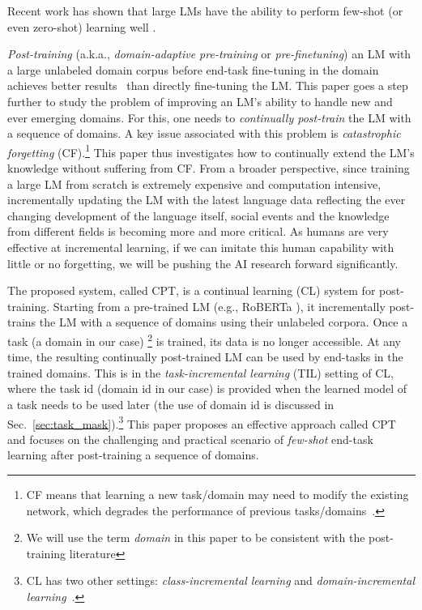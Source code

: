 \documentclass[11pt]{article}
\begin{document}
Recent work has shown that large LMs have the ability to perform few-shot (or even zero-shot) learning well \cite{DBLP:conf/nips/BrownMRSKDNSSAA20,DBLP:journals/corr/abs-2112-11446,DBLP:journals/corr/abs-2201-11990}. 
{\color{black}\textit{Post-training} (a.k.a., \textit{domain-adaptive pre-training} or \textit{pre-finetuning}) an LM with a large unlabeled domain corpus before end-task fine-tuning in the domain achieves better results~\cite{DBLP:conf/naacl/XuLSY19,gururangan2020don} than directly fine-tuning the  LM.
This paper goes a step further to study the problem of improving an LM's ability to handle new and ever emerging domains. For this, one needs to \textit{continually post-train} the LM with a sequence of domains. A key issue associated with this problem is \textit{catastrophic forgetting} (CF).\footnote{
CF means that learning a new task/domain may need to modify the existing network, which degrades the performance of previous tasks/domains~\cite{mccloskey1989catastrophic}.} This paper thus investigates how to continually extend the LM's knowledge without suffering from CF. {\color{black}From a broader perspective, since training a large LM from scratch is extremely expensive and computation intensive, incrementally updating the LM with the latest language data reflecting the ever changing development of the language itself, social events and the knowledge from different fields is becoming more and more critical. As humans are very effective at incremental learning, if we can imitate this human capability with little or no forgetting, we will be pushing the AI research forward significantly.}   

The proposed system, called CPT, is a  continual learning (CL) system for post-training. Starting from a pre-trained LM (e.g., RoBERTa \cite{DBLP:journals/corr/abs-1907-11692}), it incrementally post-trains the LM with a sequence of domains using their unlabeled corpora. Once a task (a domain in our case) \footnote{We will use the term \textit{domain} in this paper to be consistent with the post-training literature} is trained, its data is no longer accessible. At any time, the resulting continually post-trained LM can be used {\color{black}by end-tasks in the trained domains.} This is in the \textit{task-incremental learning} (TIL) setting of CL, where the task id (domain id in our case) is provided when the learned model of a task needs to be used later (the use of domain id is discussed in Sec.~\ref{sec:task_mask}).\footnote{CL has two other settings: \textit{class-incremental learning} and \textit{domain-incremental learning}~\cite{Ven2019Three}.}  This paper proposes an effective approach called CPT and focuses on the  challenging and practical scenario of \textit{few-shot} end-task learning after post-training a sequence of domains.} 
\end{document}
